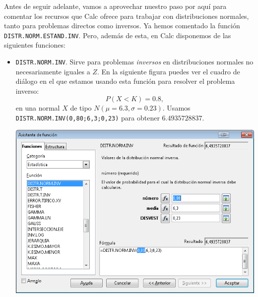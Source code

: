 \documentclass[10pt,a4paper]{article}\usepackage[]{graphicx}\usepackage[]{color}
\begin{document}
Antes de seguir adelante, vamos a aprovechar nuestro paso por aquí para comentar los recursos que Calc ofrece para trabajar con distribuciones normales, tanto para problemas directos como inversos. Ya hemos comentado la función {\tt DISTR.NORM.ESTAND.INV}. Pero, además de esta, en Calc disponemos de las siguientes funciones:

\begin{itemize}
  \item {\tt DISTR.NORM.INV}. Sirve para problemas {\em inversos} en distribuciones normales no necesariamente iguales a $Z$. En la siguiente figura puedes ver el cuadro de diálogo en el que estamos usando esta función para resolver el problema inverso:
      \[P(X<K) = 0.8, \]
      en una normal $X$ de tipo $N(\mu=6.3, \sigma=0.23)$. Usamos
      {\tt DISTR.NORM.INV(0,80;6,3;0,23)} para obtener $6.4935728837$.
            \begin{center}
            \includegraphics[width=13.52cm]{../fig/Tut06-10.png}
            \end{center}


\end{itemize}
\end{document}
